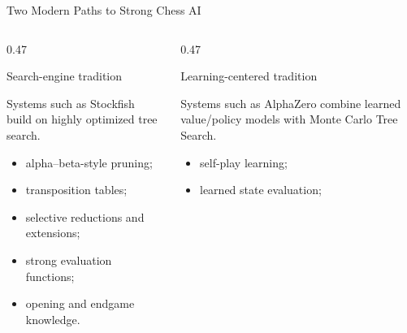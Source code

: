 \documentclass[aspectratio=169,10pt]{beamer}
\begin{document}



\begin{frame}[shrink=18]{Two Modern Paths to Strong Chess AI}

  \begin{columns}[T,onlytextwidth]

    \begin{column}{0.47\textwidth}

      \begin{block}{Search-engine tradition}

        Systems such as Stockfish build on highly optimized tree search.

        \begin{itemize}

          \item alpha--beta-style pruning;

          \item transposition tables;

          \item selective reductions and extensions;

          \item strong evaluation functions;

          \item opening and endgame knowledge.

        \end{itemize}

      \end{block}

    \end{column}

    \begin{column}{0.47\textwidth}

      \begin{block}{Learning-centered tradition}

        Systems such as AlphaZero combine learned value/policy models with Monte Carlo Tree Search.

        \begin{itemize}

          \item self-play learning;

          \item learned state evaluation;


\end{itemize}
\end{block}
\end{column}
\end{columns}
\end{frame}
\end{document}
